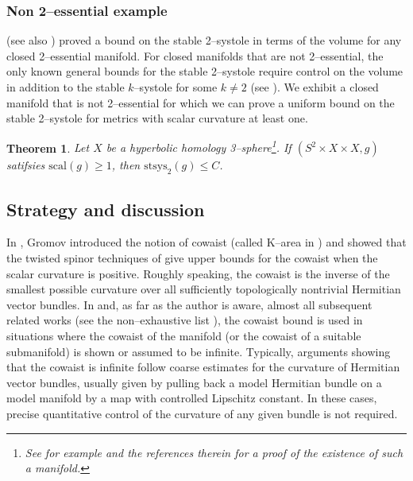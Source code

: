\documentclass[12pt]{amsart}
\newtheorem{theorem}{Theorem}[section]
\theoremstyle{definition}
\numberwithin{equation}{section}
\begin{document}
\subsubsection{Non 2--essential example}
\cite{GHK:systole} (see also \cite{Gromov:sys0, Bangert-Katz:sys}) proved a bound on the stable 2--systole in terms of the volume for any closed 2--essential manifold. For closed manifolds that are not 2--essential, the only known general bounds for the stable 2--systole require control on the volume in addition to the stable $k$--systole for some $k \neq 2$ (see \cite{Gromov:sys0, Bangert-Katz:sys, Hebda:sys}). We exhibit a closed manifold that is not 2--essential for which we can prove a uniform bound on the stable 2--systole for metrics with scalar curvature at least one.

\begin{theorem}\label{thm:non-2-ess}
Let $X$ be a hyperbolic homology 3--sphere\footnote{See for example \cite{hyp} and the references therein for a proof of the existence of such a manifold.}. If $(S^2 \times X\times X, g)$ satifsies $\mathrm{scal}(g) \geq 1$, then $\mathrm{stsys}_2(g) \leq C$.
\end{theorem}


\subsection{Strategy and discussion}
In \cite{Gromov:K-area}, Gromov introduced the notion of cowaist (called $\mathrm{K}$--area in \cite{Gromov:K-area}) and showed that the twisted spinor techniques of \cite{Gromov-Lawson:closed} give upper bounds for the cowaist when the scalar curvature is positive. Roughly speaking, the cowaist is the inverse of the smallest possible curvature over all sufficiently topologically nontrivial Hermitian vector bundles. In \cite{Gromov:K-area} and, as far as the author is aware, almost all subsequent related works (see the non--exhaustive list \cite{Davaux, Listing:intro, Bar-Hanke:intro, Wang:cowaist, Cecchini-Zeidler:spin, Shi:intro, Su-Wang:intro}), the cowaist bound is used in situations where the cowaist of the manifold (or the cowaist of a suitable submanifold) is shown or assumed to be infinite. Typically, arguments showing that the cowaist is infinite follow coarse estimates for the curvature of Hermitian vector bundles, usually given by pulling back a model Hermitian bundle on a model manifold by a map with controlled Lipschitz constant. In these cases, precise quantitative control of the curvature of any given bundle is not required.
\end{document}
